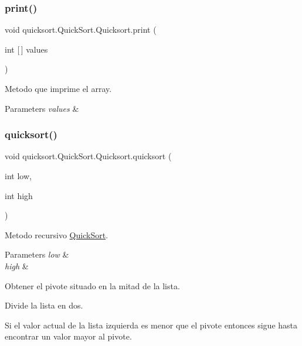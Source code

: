 \subsubsection{\texorpdfstring{print()}{print()}}
{\footnotesize\ttfamily void quicksort.\+Quick\+Sort.\+Quicksort.\+print (\begin{DoxyParamCaption}\item[{int \mbox{[}$\,$\mbox{]}}]{values }\end{DoxyParamCaption})}



Metodo que imprime el array. 


\begin{DoxyParams}{Parameters}
{\em values} & \\
\hline
\end{DoxyParams}
\hypertarget{classquicksort_1_1_quick_sort_1_1_quicksort_acebd97e5f32c5170226150de796e9c85}{}\label{classquicksort_1_1_quick_sort_1_1_quicksort_acebd97e5f32c5170226150de796e9c85} 
\subsubsection{\texorpdfstring{quicksort()}{quicksort()}}
{\footnotesize\ttfamily void quicksort.\+Quick\+Sort.\+Quicksort.\+quicksort (\begin{DoxyParamCaption}\item[{int}]{low,  }\item[{int}]{high }\end{DoxyParamCaption})\hspace{0.3cm}{\ttfamily [private]}}



Metodo recursivo \hyperlink{namespacequicksort_1_1_quick_sort}{Quick\+Sort}. 


\begin{DoxyParams}{Parameters}
{\em low} & \\
\hline
{\em high} & \\
\hline
\end{DoxyParams}
Obtener el pivote situado en la mitad de la lista.

Divide la lista en dos.

Si el valor actual de la lista izquierda es menor que el pivote entonces sigue hasta encontrar un valor mayor al pivote.

